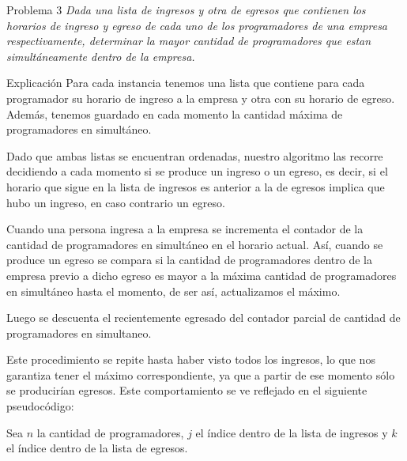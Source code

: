 \begin{section}{Problema 3}
	\textit{Dada una lista de ingresos y otra de egresos que contienen los horarios de ingreso y egreso de cada uno de los programadores de una empresa respectivamente, determinar la mayor cantidad de programadores que estan simultáneamente dentro de la empresa.}

	\begin{subsection}{Explicación}
		Para cada instancia tenemos una lista que contiene para cada programador su horario de ingreso a la empresa y otra con su horario de egreso. Además, tenemos guardado en cada momento la cantidad máxima de programadores en simultáneo.

Dado que ambas listas se encuentran ordenadas, nuestro algoritmo las recorre decidiendo a cada momento si se produce un ingreso o un egreso, es decir, si el horario que sigue en la lista de ingresos es anterior a la de egresos implica que hubo un ingreso, en caso contrario un egreso.

Cuando una persona ingresa a la empresa se incrementa el contador de la cantidad de programadores en simultáneo en el horario actual. Así, cuando se produce un egreso se compara si la cantidad de programadores dentro de la empresa previo a dicho egreso es mayor a la máxima cantidad de programadores en simultáneo hasta el momento, de ser así, actualizamos el máximo.

Luego se descuenta el recientemente egresado del contador parcial de cantidad de programadores en simultaneo.

Este procedimiento se repite hasta haber visto todos los ingresos, lo que nos garantiza tener el máximo correspondiente, ya que a partir de ese momento sólo se producirían egresos. Este comportamiento se ve reflejado en el siguiente pseudocódigo:

		\pagebreak
		Sea $n$ la cantidad de programadores, $j$ el índice dentro de la lista de ingresos y $k$ el índice dentro de la lista de egresos.
		

\end{subsection}
\end{section}
